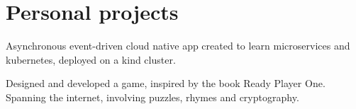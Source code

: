 \documentclass[]{font}
\begin{document}
\begin{minipage}[t]{0.66\textwidth}


\sectionsep



\section{Personal projects}

Asynchronous event-driven cloud native app created to learn microservices and kubernetes, deployed on a kind cluster.
\sectionsep

Designed and developed a game, inspired by the book Ready Player One. Spanning the internet, involving puzzles, rhymes and cryptography.
\sectionsep



\end{minipage} 
\end{document}
